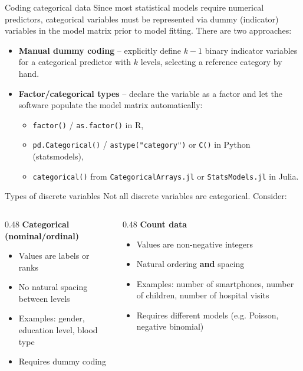 \documentclass[10pt,ignorenonframetext,aspectratio=169]{beamer}
\begin{document}
\begin{frame}{Coding categorical data}
Since most statistical models require numerical predictors, categorical variables must be
represented via dummy (indicator) variables in the model matrix prior to model fitting.
There are two approaches:
\begin{itemize}
    \item \textbf{Manual dummy coding} -- explicitly define $k-1$ binary indicator variables
    for a categorical predictor with $k$ levels, selecting a reference category by hand.
    \item \textbf{Factor/categorical types} -- declare the variable as a factor and let the
    software populate the model matrix automatically:
    \begin{itemize}
        \item \texttt{factor()} / \texttt{as.factor()} in R,
        \item \texttt{pd.Categorical()} / \texttt{astype("category")} or \texttt{C()} in Python (statsmodels),
        \item \texttt{categorical()} from \texttt{CategoricalArrays.jl} or \texttt{StatsModels.jl} in Julia.
    \end{itemize}
\end{itemize}
\end{frame}

\begin{frame}{Types of discrete variables}
Not all discrete variables are categorical. Consider:

\begin{columns}
    \begin{column}{0.48\textwidth}
        \textbf{Categorical (nominal/ordinal)}
        \begin{itemize}
            \item Values are labels or ranks
            \item No natural spacing between levels
            \item Examples: gender, education level, blood type
            \item Requires dummy coding
        \end{itemize}
    \end{column}
    \begin{column}{0.48\textwidth}
        \textbf{Count data}
        \begin{itemize}
            \item Values are non-negative integers
            \item Natural ordering \textbf{and} spacing
            \item Examples: number of smartphones, number of children, number of hospital visits
            \item Requires different models (e.g. Poisson, negative binomial)
        \end{itemize}
    \end{column}
\end{columns}

\end{frame}
\end{document}
